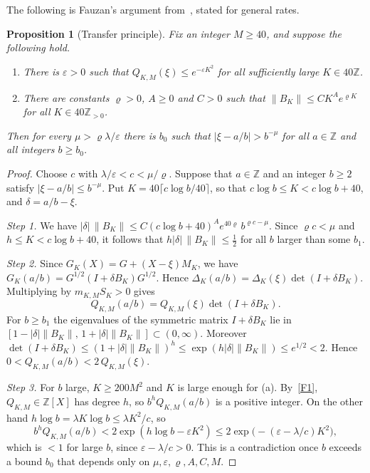 \documentclass[11pt]{article}
\newtheorem{proposition}{Proposition}
\theoremstyle{remark}
\newcommand{\Z}{\mathbb{Z}}
\begin{document}
The following is Fauzan's argument from~\cite[App.~C.2]{F}, stated for general rates.

\begin{proposition}[Transfer principle]\label{prop:transfer}
Fix an integer $M\ge40$, and suppose the following hold.
\begin{enumerate}[label=(\alph*)]
\item There is $\varepsilon>0$ such that $Q_{K,M}(\xi)\le e^{-\varepsilon K^2}$ for all sufficiently large $K\in40\Z$.
\item There are constants $\varrho>0$, $A\ge0$ and $C>0$ such that $\|B_K\|\le CK^Ae^{\varrho K}$ for all $K\in40\Z_{>0}$.
\end{enumerate}
Then for every $\mu>\varrho\lambda/\varepsilon$ there is $b_0$ such that $|\xi-a/b|>b^{-\mu}$ for all $a\in\Z$ and all integers $b\ge b_0$.
\end{proposition}

\begin{proof}
Choose $c$ with $\lambda/\varepsilon<c<\mu/\varrho$. Suppose that $a\in\Z$ and an integer $b\ge2$ satisfy $|\xi-a/b|\le b^{-\mu}$. Put $K=40\lceil c\log b/40\rceil$, so that $c\log b\le K<c\log b+40$, and $\delta=a/b-\xi$.

\emph{Step 1.} We have $|\delta|\,\|B_K\|\le C(c\log b+40)^Ae^{40\varrho}\,b^{\varrho c-\mu}$. Since $\varrho c<\mu$ and $h\le K<c\log b+40$, it follows that $h|\delta|\,\|B_K\|\le\frac12$ for all $b$ larger than some $b_1$.

\emph{Step 2.} Since $G_K(X)=G+(X-\xi)M_K$, we have $G_K(a/b)=G^{1/2}(I+\delta B_K)G^{1/2}$. Hence $\Delta_K(a/b)=\Delta_K(\xi)\det(I+\delta B_K)$. Multiplying by $m_{K,M}S_K>0$ gives
\[
Q_{K,M}(a/b)=Q_{K,M}(\xi)\det(I+\delta B_K).
\]
For $b\ge b_1$ the eigenvalues of the symmetric matrix $I+\delta B_K$ lie in $[1-|\delta|\|B_K\|,\,1+|\delta|\|B_K\|]\subset(0,\infty)$. Moreover $\det(I+\delta B_K)\le(1+|\delta|\|B_K\|)^h\le\exp(h|\delta|\|B_K\|)\le e^{1/2}<2$. Hence $0<Q_{K,M}(a/b)<2\,Q_{K,M}(\xi)$.

\emph{Step 3.} For $b$ large, $K\ge200M^2$ and $K$ is large enough for (a). By~\ref{F1}, $Q_{K,M}\in\Z[X]$ has degree $h$, so $b^hQ_{K,M}(a/b)$ is a positive integer. On the other hand $h\log b=\lambda K\log b\le\lambda K^2/c$, so
\[
b^hQ_{K,M}(a/b)<2\exp(h\log b-\varepsilon K^2)\le2\exp\bigl(-(\varepsilon-\lambda/c)K^2\bigr),
\]
which is $<1$ for large $b$, since $\varepsilon-\lambda/c>0$. This is a contradiction once $b$ exceeds a bound $b_0$ that depends only on $\mu,\varepsilon,\varrho,A,C,M$.
\end{proof}
\end{document}
